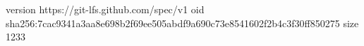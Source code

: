 version https://git-lfs.github.com/spec/v1
oid sha256:7cac9341a3aa8e698b2f69ee505abdf9a690c73e8541602f2b4c3f30ff850275
size 1233
